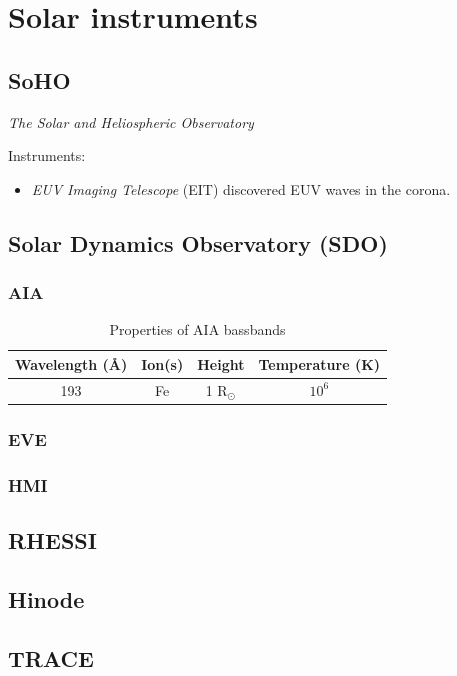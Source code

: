 \documentclass{article}
\begin{document}
\section{Solar instruments}
\subsection{SoHO}
\emph{The Solar and Heliospheric Observatory}

Instruments:
\begin{itemize}
    \item \emph{EUV Imaging Telescope} (EIT) discovered EUV waves
        in the corona.
\end{itemize}

\subsection{Solar Dynamics Observatory (SDO)}
\subsubsection{AIA}
\begin{table}[h]
    \centering
    \begin{tabular}{c c c c}
        Wavelength (\AA{}) & Ion(s) & Height & Temperature (K)\\
        \hline
        193 & Fe & 1 R$_{\odot}$ & $10^{6}$\\
        \hline\hline
    \end{tabular}
    \caption{Properties of AIA bassbands}
\end{table}
\subsubsection{EVE}
\subsubsection{HMI}
\subsection{RHESSI}
\subsection{Hinode}
\subsection{TRACE}
\end{document}
